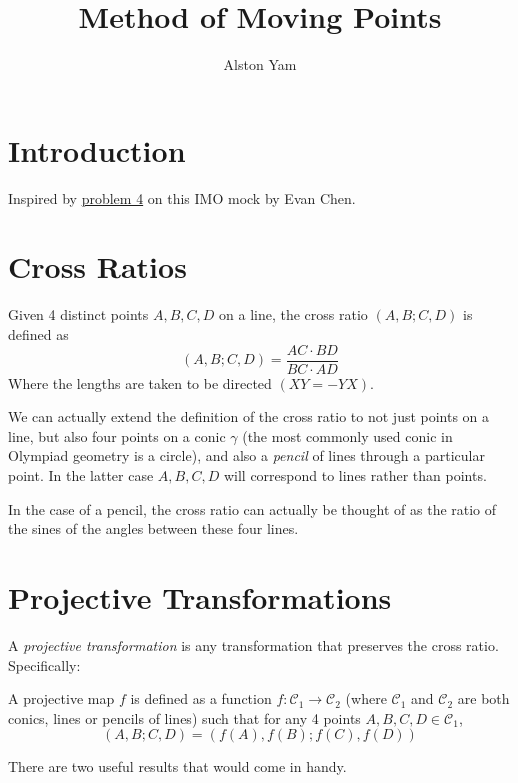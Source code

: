 \documentclass{article}
\title{Method of Moving Points}
\author{Alston Yam}
\date{}
\theoremstyle{mytheoremstyle}
\theoremstyle{mytheoremstyle}
\theoremstyle{myproblemstyle}
\begin{document}
    \maketitle

    \section{Introduction}
    Inspired by \href{https://web.evanchen.cc/static/mop/mockimo/2020.pdf}{problem 4} on this IMO mock by Evan Chen.

    \section{Cross Ratios}
    \begin{definition}
        Given 4 distinct points $A, B, C, D$ on a line, the cross ratio $(A, B; C, D)$ is defined as \[(A, B; C, D) = \frac{AC \cdot BD}{BC \cdot AD}\]
        Where the lengths are taken to be directed $(XY = -YX)$.
    \end{definition}

    We can actually extend the definition of the cross ratio to not just points on a line, but also four points on a conic $\gamma$ (the most commonly used conic in Olympiad geometry is a circle), and also a \textit{pencil} of lines through a particular point. In the latter case $A, B, C, D$ will correspond to lines rather than points.

    In the case of a pencil, the cross ratio can actually be thought of as the ratio of the sines of the angles between these four lines. 

    \section{Projective Transformations}

    A \textit{projective transformation} is any transformation that preserves the cross ratio. Specifically:

    \begin{definition}
        A projective map $f$ is defined as a function $f:\mathcal{C}_1 \to \mathcal{C}_2$ (where $\mathcal{C}_1$ and $\mathcal{C}_2$ are both conics, lines or pencils of lines) such that for any 4 points $A, B, C, D \in \mathcal{C}_1$, \[(A, B; C, D) = (f(A), f(B); f(C), f(D))\]
    \end{definition}

    There are two useful results that would come in handy.
\end{document}
